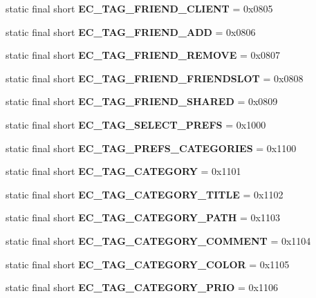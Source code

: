 \begin{DoxyCompactItemize}
\item 
static final short {\bfseries EC\_\-TAG\_\-FRIEND\_\-CLIENT} = 0x0805\label{interfaceECCodes_a053d488c042549a95fe57a980e9082c5}

\item 
static final short {\bfseries EC\_\-TAG\_\-FRIEND\_\-ADD} = 0x0806\label{interfaceECCodes_a62978af61a1e10846734a3a846ec32a6}

\item 
static final short {\bfseries EC\_\-TAG\_\-FRIEND\_\-REMOVE} = 0x0807\label{interfaceECCodes_ab63ed11bdd4ca763b01c7625243bcdbb}

\item 
static final short {\bfseries EC\_\-TAG\_\-FRIEND\_\-FRIENDSLOT} = 0x0808\label{interfaceECCodes_adf44938b5733860b7b1dd98071365b5b}

\item 
static final short {\bfseries EC\_\-TAG\_\-FRIEND\_\-SHARED} = 0x0809\label{interfaceECCodes_a4596f739e8f04342d03a2f60a0b9ab5e}

\item 
static final short {\bfseries EC\_\-TAG\_\-SELECT\_\-PREFS} = 0x1000\label{interfaceECCodes_ab2502c9fa1d4aa1e26ecf6c8f1bfad92}

\item 
static final short {\bfseries EC\_\-TAG\_\-PREFS\_\-CATEGORIES} = 0x1100\label{interfaceECCodes_a9c646093d3aee7a9054a68c02688d444}

\item 
static final short {\bfseries EC\_\-TAG\_\-CATEGORY} = 0x1101\label{interfaceECCodes_ad1e1618c6d29a7051d9afa0007421fac}

\item 
static final short {\bfseries EC\_\-TAG\_\-CATEGORY\_\-TITLE} = 0x1102\label{interfaceECCodes_a0c594a99bbd1111956aaf4fc0f0e0371}

\item 
static final short {\bfseries EC\_\-TAG\_\-CATEGORY\_\-PATH} = 0x1103\label{interfaceECCodes_aa343d5f936a2f060973cf99ceb5df746}

\item 
static final short {\bfseries EC\_\-TAG\_\-CATEGORY\_\-COMMENT} = 0x1104\label{interfaceECCodes_a8788f48843cb18150a1bea298d986dd4}

\item 
static final short {\bfseries EC\_\-TAG\_\-CATEGORY\_\-COLOR} = 0x1105\label{interfaceECCodes_ae202578e82a6f01bb60b4082d6f57b21}

\item 
static final short {\bfseries EC\_\-TAG\_\-CATEGORY\_\-PRIO} = 0x1106\label{interfaceECCodes_a8f458f8aa2f4aa8bfe08a22bdece44c3}


\end{DoxyCompactItemize}
